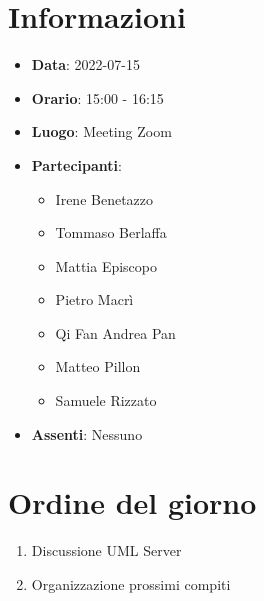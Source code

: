 \section{Informazioni}
	\begin{itemize}
		\item \textbf{Data}: 2022-07-15
		\item \textbf{Orario}: 15:00 - 16:15
		\item \textbf{Luogo}: Meeting Zoom
		\item \textbf{Partecipanti}:
		\begin{itemize}
			\item Irene Benetazzo
			\item Tommaso Berlaffa
			\item Mattia Episcopo
			\item Pietro Macrì
			\item Qi Fan Andrea Pan
			\item Matteo Pillon
			\item Samuele Rizzato
		\end{itemize}
        \item \textbf{Assenti}: Nessuno
	\end{itemize}
    
	\section{Ordine del giorno}
	\begin{enumerate}
		\item Discussione UML Server
		\item Organizzazione prossimi compiti
	\end{enumerate}
	\newpage